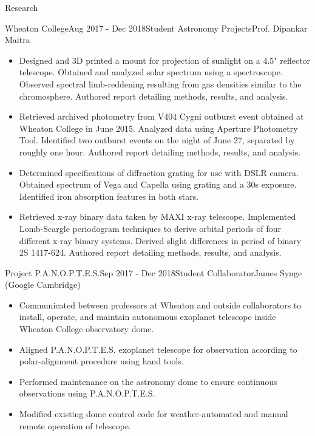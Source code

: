 \documentclass{resume} %
\begin{document}
\begin{rSection}{Research}
\begin{rSubsection}{Wheaton College}{Aug 2017 - Dec 2018}{Student Astronomy Projects}{Prof. Dipankar Maitra}
\begin{itemize}
\item Designed and 3D printed a mount for projection of sunlight on a 4.5" reflector telescope. Obtained and analyzed solar spectrum using a spectroscope. Observed spectral limb-reddening resulting from gas densities similar to the chromosphere. Authored report detailing methods, results, and analysis.
\item Retrieved archived photometry from V404 Cygni outburst event obtained at Wheaton College in June 2015. Analyzed data using Aperture Photometry Tool. Identified two outburst events on the night of June 27, separated by roughly one hour. Authored report detailing methods, results, and analysis.
\item Determined specifications of diffraction grating for use with DSLR camera. Obtained spectrum of Vega and Capella using grating and a 30s exposure. Identified iron absorption features in both stars.
\item Retrieved x-ray binary data taken by MAXI x-ray telescope. Implemented Lomb-Scargle periodogram techniques to derive orbital periods of four different x-ray binary systems. Derived slight differences in period of binary 2S 1417-624. Authored report detailing methods, results, and analysis.
\end{itemize}
\end{rSubsection}


\begin{rSubsection}{Project P.A.N.O.P.T.E.S.}{Sep 2017 - Dec 2018}{Student Collaborator}{James Synge (Google Cambridge)}
\begin{itemize}
\item Communicated between professors at Wheaton and outside collaborators to install, operate, and maintain autonomous exoplanet telescope inside Wheaton College observatory dome.
\item Aligned P.A.N.O.P.T.E.S. exoplanet telescope for observation according to polar-alignment procedure using hand tools.
\item Performed maintenance on the astronomy dome to ensure continuous observations using P.A.N.O.P.T.E.S.
\item Modified existing dome control code for weather-automated and manual remote operation of telescope.
\end{itemize}
\end{rSubsection}


\end{rSection}
\end{document}
